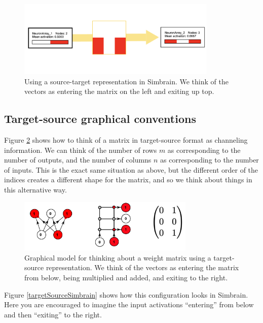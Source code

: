 \begin{figure}[h]
\centering
\includegraphics[width=0.85\textwidth]{images/sourceTargetSimbrain.png}
\caption[Jeff Yoshimi.]{Using a source-target representation in Simbrain. We think of the vectors as entering the matrix on the left and exiting up top.}
\label{sourceTargetSimbrain}
\end{figure}

\subsection{Target-source graphical conventions}

Figure \ref{targetSourceConvention} shows how to think of a matrix in target-source format as channeling information.  We can think of the number of rows $m$ as corresponding to the number of outputs, and the number of columns $n$ as corresponding to the number of inputs. This is the exact same situation as above, but the different order of the indices creates a different shape for the matrix, and so we  think about things in this alternative way.  

\begin{figure}[h]
\centering
\includegraphics[width=0.75\textwidth]{images/targetSource.png}
\caption[Jeff Yoshimi.]{Graphical model for thinking about a weight matrix using a target-source representation. We think of the vectors as entering the matrix from below, being multiplied and added, and exiting to the right. }
\label{targetSourceConvention}
\end{figure}

Figure \ref{targetSourceSimbrain} shows how this configuration looks in Simbrain. Here you are encouraged to imagine  the input activations  ``entering'' from below and then ``exiting'' to the right.

